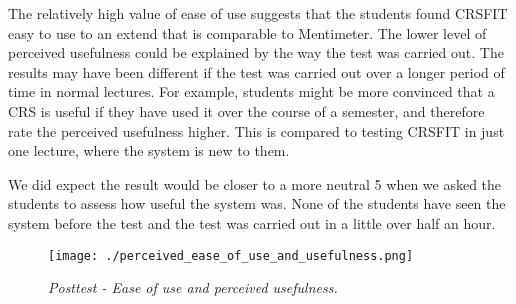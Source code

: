 The relatively high value of ease of use suggests that the students found CRSFIT easy to use to an extend that is comparable to Mentimeter. The lower level of perceived usefulness could be explained by the way the test was carried out. The results may have been different if the test was carried out over a longer period of time in normal lectures. For example, students might be more convinced that a CRS is useful if they have used it over the course of a semester, and therefore rate the perceived usefulness higher. This is compared to testing CRSFIT in just one lecture, where the system is new to them.

We did expect the result would be closer to a more neutral 5 when we asked the students to assess how useful the system was. None of the students have seen the system before the test and the test was carried out in a little over half an hour. 

 \begin{figure}[H]
  \centering
     \texttt{[image: ./perceived\_ease\_of\_use\_and\_usefulness.png]}
     \caption{\emph{Posttest - Ease of use and perceived usefulness.}}
     \label{fig:perceived_ease_of_use_and_usefulness}
 \end{figure}












 
 
















